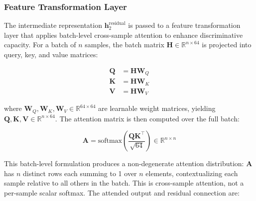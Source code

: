 \documentclass[10pt,letterpaper]{article}
\newcommand{\hlpar}[1]{\leavevmode\colorbox{yellow!30}{\parbox{\dimexpr\linewidth-2\fboxsep\relax}{#1}}\vspace{2pt}}
\begin{document}
                                                                                         \subsubsection*{\textbf{Feature Transformation Layer}}

                                                                                                         \hlpar{The intermediate representation $\mathbf{h}_2^{\text{residual}}$ is passed to a feature transformation layer that applies batch-level cross-sample attention to enhance discriminative capacity. For a batch of $n$ samples, the batch matrix $\mathbf{H} \in \mathbb{R}^{n \times 64}$ is projected into query, key, and value matrices:}
                                                                                                         \begin{align}
                                                                                                             \mathbf{Q} &= \mathbf{H} \mathbf{W}_Q \\
                                                                                                                 \mathbf{K} &= \mathbf{H} \mathbf{W}_K \\
                                                                                                                     \mathbf{V} &= \mathbf{H} \mathbf{W}_V
                                                                                                                     \end{align}
                                                                                                                     \hlpar{where $\mathbf{W}_Q, \mathbf{W}_K, \mathbf{W}_V \in \mathbb{R}^{64 \times 64}$ are learnable weight matrices, yielding $\mathbf{Q}, \mathbf{K}, \mathbf{V} \in \mathbb{R}^{n \times 64}$. The attention matrix is then computed over the full batch:}
                                                                                                     \begin{equation}
                                                                                                         \mathbf{A} = \text{softmax}\!\left(\frac{\mathbf{Q}\mathbf{K}^\top}{\sqrt{64}}\right) \in \mathbb{R}^{n \times n}
                                                                                                         \end{equation}
                                                                                                         \hlpar{This batch-level formulation produces a non-degenerate attention distribution: $\mathbf{A}$ has $n$ distinct rows each summing to 1 over $n$ elements, contextualizing each sample relative to all others in the batch. This is cross-sample attention, not a per-sample scalar softmax. The attended output and residual connection are:}
\end{document}
